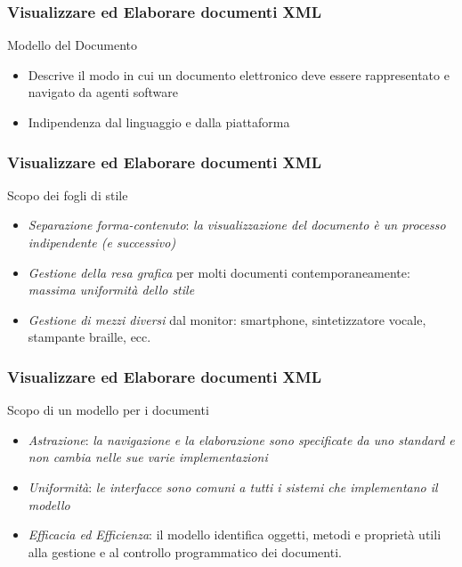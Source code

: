 \documentclass{beamer}
\begin{document}
    \begin{frame}
        \frametitle{Visualizzare ed Elaborare documenti XML}
        \addtocounter{nframe}{1}
        
        \begin{block}{Modello del Documento}
           \begin{itemize}
               \item Descrive il modo in cui un documento elettronico deve essere rappresentato e navigato da agenti software
               \item Indipendenza dal linguaggio e dalla piattaforma
           \end{itemize}
        \end{block}
        
    \end{frame}
    
    \begin{frame}
        \frametitle{Visualizzare ed Elaborare documenti XML}
        \addtocounter{nframe}{1}
        
        \begin{block}{Scopo dei fogli di stile}
           \begin{itemize}
               \item \emph{Separazione forma-contenuto}: \textit{la visualizzazione del documento è un processo indipendente (e successivo)}
               \item \emph{Gestione della resa grafica} per molti documenti contemporaneamente: \textit{massima uniformità dello stile}
               \item \emph{Gestione di mezzi diversi} dal monitor: smartphone, sintetizzatore
               vocale, stampante braille, ecc.
           \end{itemize}
        \end{block}
        
    \end{frame}

    \begin{frame}
        \frametitle{Visualizzare ed Elaborare documenti XML}
        \addtocounter{nframe}{1}
        
        \begin{block}{Scopo di un modello per i documenti}
           \begin{itemize}
               \item \emph{Astrazione}: \textit{la navigazione e la elaborazione sono specificate da uno standard e non cambia nelle sue varie implementazioni}
               \item \emph{Uniformità}: \textit{le interfacce sono comuni a tutti i sistemi che implementano il modello}
               \item \emph{Efficacia ed Efficienza}: il modello identifica oggetti, metodi e proprietà utili alla gestione e al controllo programmatico dei documenti. 
           \end{itemize}
        \end{block}
        
    \end{frame}
\end{document}
